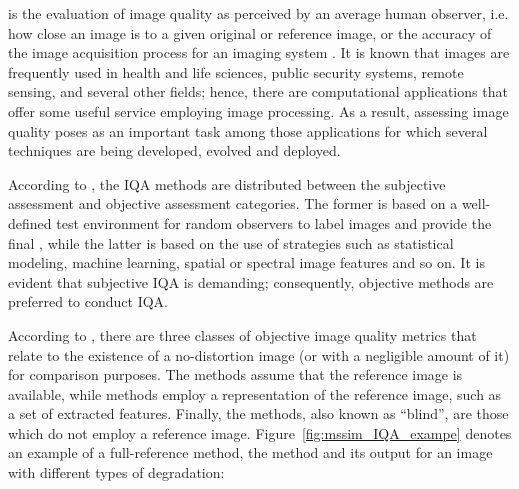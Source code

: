  is the evaluation of image quality as perceived by an average human observer, i.e. how close an image is to a given original or reference image, or the accuracy of the image acquisition process for an imaging system \cite{bovik2009essential}. It is known that images are frequently used in health and life sciences, public security systems, remote sensing, and several other fields; hence, there are computational applications that offer some useful service employing image processing. As a result, assessing image quality poses as an important task among those applications for which several techniques are being developed, evolved and deployed.

According to , the IQA methods are distributed between the subjective assessment and objective assessment categories. The former is based on a well-defined test environment for random observers to label images and provide the final , while the latter is based on the use of strategies such as statistical modeling, machine learning, spatial or spectral image features and so on. It is evident that subjective IQA is demanding; consequently, objective methods are preferred to conduct IQA.

According to , there are three classes of objective image quality metrics that relate to the existence of a no-distortion image (or with a negligible amount of it) for comparison purposes. The  methods assume that the reference image is available, while  methods employ a representation of the reference image, such as a set of extracted features. Finally, the  methods, also known as ``blind'', are those which do not employ a reference image. Figure~\ref{fig:mssim_IQA_exampe} denotes an example of a full-reference method, the  method and its output for an image with different types of degradation:

